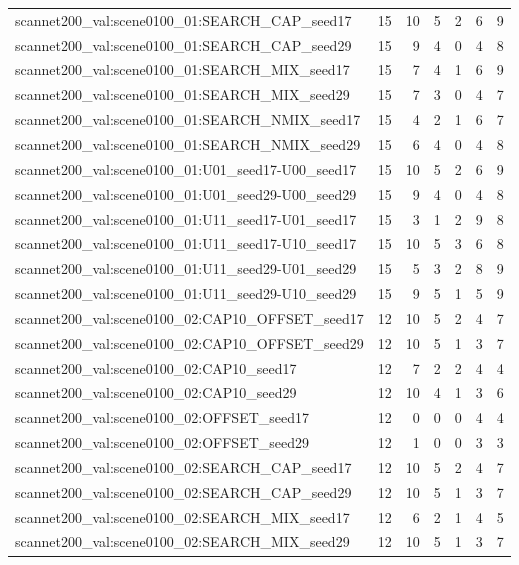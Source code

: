 \begin{table}[t]
\begin{tabular}{lrrrrrr}
scannet200\_val:scene0100\_01:SEARCH\_CAP\_seed17 & 15 & 10 & 5 & 2 & 6 & 9 \\
scannet200\_val:scene0100\_01:SEARCH\_CAP\_seed29 & 15 & 9 & 4 & 0 & 4 & 8 \\
scannet200\_val:scene0100\_01:SEARCH\_MIX\_seed17 & 15 & 7 & 4 & 1 & 6 & 9 \\
scannet200\_val:scene0100\_01:SEARCH\_MIX\_seed29 & 15 & 7 & 3 & 0 & 4 & 7 \\
scannet200\_val:scene0100\_01:SEARCH\_NMIX\_seed17 & 15 & 4 & 2 & 1 & 6 & 7 \\
scannet200\_val:scene0100\_01:SEARCH\_NMIX\_seed29 & 15 & 6 & 4 & 0 & 4 & 8 \\
scannet200\_val:scene0100\_01:U01\_seed17-U00\_seed17 & 15 & 10 & 5 & 2 & 6 & 9 \\
scannet200\_val:scene0100\_01:U01\_seed29-U00\_seed29 & 15 & 9 & 4 & 0 & 4 & 8 \\
scannet200\_val:scene0100\_01:U11\_seed17-U01\_seed17 & 15 & 3 & 1 & 2 & 9 & 8 \\
scannet200\_val:scene0100\_01:U11\_seed17-U10\_seed17 & 15 & 10 & 5 & 3 & 6 & 8 \\
scannet200\_val:scene0100\_01:U11\_seed29-U01\_seed29 & 15 & 5 & 3 & 2 & 8 & 9 \\
scannet200\_val:scene0100\_01:U11\_seed29-U10\_seed29 & 15 & 9 & 5 & 1 & 5 & 9 \\
scannet200\_val:scene0100\_02:CAP10\_OFFSET\_seed17 & 12 & 10 & 5 & 2 & 4 & 7 \\
scannet200\_val:scene0100\_02:CAP10\_OFFSET\_seed29 & 12 & 10 & 5 & 1 & 3 & 7 \\
scannet200\_val:scene0100\_02:CAP10\_seed17 & 12 & 7 & 2 & 2 & 4 & 4 \\
scannet200\_val:scene0100\_02:CAP10\_seed29 & 12 & 10 & 4 & 1 & 3 & 6 \\
scannet200\_val:scene0100\_02:OFFSET\_seed17 & 12 & 0 & 0 & 0 & 4 & 4 \\
scannet200\_val:scene0100\_02:OFFSET\_seed29 & 12 & 1 & 0 & 0 & 3 & 3 \\
scannet200\_val:scene0100\_02:SEARCH\_CAP\_seed17 & 12 & 10 & 5 & 2 & 4 & 7 \\
scannet200\_val:scene0100\_02:SEARCH\_CAP\_seed29 & 12 & 10 & 5 & 1 & 3 & 7 \\
scannet200\_val:scene0100\_02:SEARCH\_MIX\_seed17 & 12 & 6 & 2 & 1 & 4 & 5 \\
scannet200\_val:scene0100\_02:SEARCH\_MIX\_seed29 & 12 & 10 & 5 & 1 & 3 & 7 \\

\end{tabular}
\end{table}
